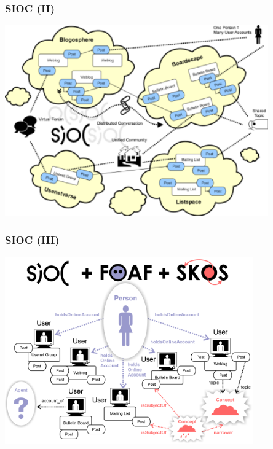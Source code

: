\documentclass[spanish,notes=hide]{beamer}
\begin{document}
\frame
{
  \frametitle{SIOC (II)}

  \begin{center}
	\includegraphics[width=0.85\textwidth]{images/sioc-discussion.png}
  \end{center}
}
\frame
{
  \frametitle{SIOC (III)}

  \begin{center}
	\includegraphics[width=0.8\textwidth]{images/sioc-foaf-skos.png}
  \end{center}
}
\frame
\end{document}

